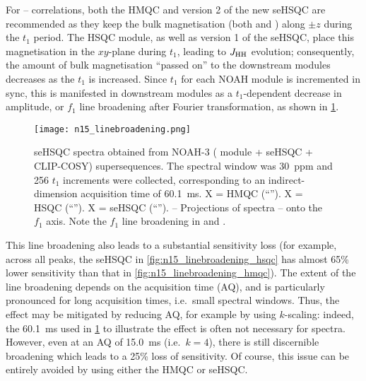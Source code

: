For \nitrogen{}--\proton{} correlations, both the HMQC and version 2 of the new seHSQC are recommended as they keep the bulk magnetisation (both  and ) along $\pm z$ during the $t_1$ period.
The HSQC module, as well as version 1 of the seHSQC, place this magnetisation in the $xy$-plane during $t_1$, leading to $\jhh$ evolution; consequently, the amount of bulk magnetisation ``passed on'' to the downstream modules decreases as the \nitrogen{} $t_1$ is increased.
Since $t_1$ for each NOAH module is incremented in sync, this is manifested in downstream modules as a $t_1$-dependent decrease in amplitude, or $f_1$ line broadening after Fourier transformation, as shown in \cref{fig:n15_linebroadening}.

\begin{figure}
    \centering
    \texttt{[image: n15\_linebroadening.png]}
    {\label{fig:n15_linebroadening_hmqc}}
    {\label{fig:n15_linebroadening_hsqc}}
    {\label{fig:n15_linebroadening_spv2}}
    {\label{fig:n15_linebroadening_hmqc_f2proj}}
    {\label{fig:n15_linebroadening_hsqc_f2proj}}
    {\label{fig:n15_linebroadening_spv2_f2proj}}
    \caption{
        \carbon{} seHSQC spectra obtained from NOAH-3  (\nitrogen{} module + \carbon{} seHSQC + CLIP-COSY) supersequences.
        The \nitrogen{} spectral window was \SI{30}{ppm} and 256 $t_1$ increments were collected, corresponding to an indirect-dimension \nitrogen{} acquisition time of \SI{60.1}{\ms}.
        \textbf{} X = HMQC (``\noahM{}'').
        \textbf{} X = HSQC (``\noahS{}'').
        \textbf{} X = seHSQC (``\noahSpn{}'').
        \textbf{}--\textbf{} Projections of spectra \textbf{}--\textbf{} onto the $f_1$ axis.
        Note the $f_1$ line broadening in  and .
        \grami{}
    }
    \label{fig:n15_linebroadening}
\end{figure}

This line broadening also leads to a substantial sensitivity loss (for example, across all peaks, the \carbon{} seHSQC in \cref{fig:n15_linebroadening_hsqc} has almost 65\% lower sensitivity than that in \cref{fig:n15_linebroadening_hmqc}).
The extent of the line broadening depends on the acquisition time (AQ), and is particularly pronounced for long acquisition times, i.e.\ small \nitrogen{} spectral windows.
Thus, the effect may be mitigated by reducing AQ, for example by using $k$-scaling: indeed, the \SI{60.1}{\ms} used in \cref{fig:n15_linebroadening} to illustrate the effect is often not necessary for \nitrogen{} spectra.
However, even at an AQ of \SI{15.0}{\ms} (i.e.\ $k = 4$), there is still discernible broadening which leads to a 25\% loss of sensitivity.
Of course, this issue can be entirely avoided by using either the HMQC or seHSQC.


